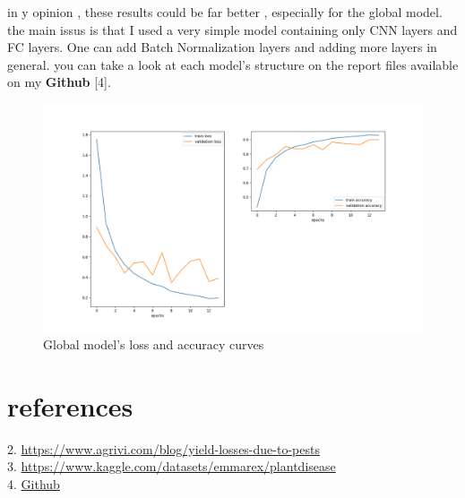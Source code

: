 \documentclass{article}
\begin{document}
\begin{multicols}{2}
in y opinion , these results could be far better , especially for the global model. the main issus is that I used a very simple model containing only CNN layers and FC layers. One can add Batch Normalization layers and adding more layers in general. you can take a look at each model's structure on the report files available on my \textbf{Github} [4].
\end{multicols}

\begin{figure}[H]
\centerline{\includegraphics[scale=0.4]{img/global_results}}
\caption{Global model's loss and accuracy curves}
\end{figure}

\section{references}
2. \href{https://www.agrivi.com/blog/yield-losses-due-to-pests}{https://www.agrivi.com/blog/yield-losses-due-to-pests} \\
3. \href{https://www.kaggle.com/datasets/emmarex/plantdisease}{https://www.kaggle.com/datasets/emmarex/plantdisease}\\
4.  \href{}{Github}
\end{document}
